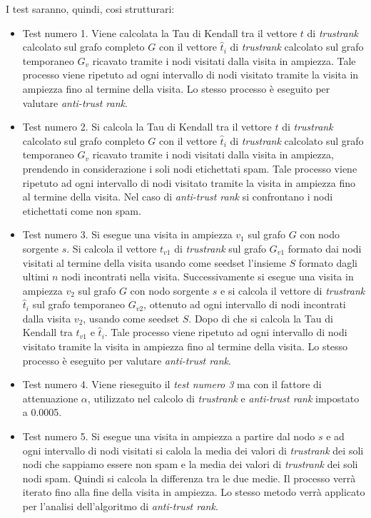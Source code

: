 I test saranno, quindi, cosi strutturari:
\begin{itemize}
 \item Test numero 1. Viene calcolata la Tau di Kendall tra il  vettore \(t\) di \textit{trustrank} calcolato sul grafo completo \(G\) con il vettore \(\hat{t}_i\) di \textit{trustrank} calcolato sul grafo temporaneo \(G_v\) ricavato tramite i nodi visitati dalla visita in ampiezza. Tale processo viene ripetuto ad ogni intervallo di nodi visitato tramite la visita in ampiezza fino al termine della visita. Lo stesso processo è eseguito per valutare \textit{anti-trust rank}.
 
 \item Test numero 2. Si calcola la Tau di Kendall tra il vettore \(t\)  di \textit{trustrank} calcolato sul grafo completo \(G\) con il vettore \(\hat{t}_i\) di \textit{trustrank} calcolato sul grafo temporaneo \(G_v\) ricavato tramite i nodi visitati dalla visita in ampiezza, prendendo in considerazione i soli nodi etichettati spam.  Tale processo viene ripetuto ad ogni intervallo di nodi visitato tramite la visita in ampiezza fino al termine della visita. Nel caso di \textit{anti-trust rank} si  confrontano i nodi etichettati come non spam.
 
 \item Test numero 3. Si esegue una visita in ampiezza \(v_1\) sul grafo \(G\) con nodo sorgente \(s\). Si calcola il vettore \(t_{v1}\) di \textit{trustrank} sul grafo \(G_{v1}\) formato dai nodi visitati al termine della visita usando come seedset l'insieme \(S\) formato dagli ultimi \(n\) nodi incontrati nella visita. Successivamente si esegue una visita in ampiezza \(v_2\) sul grafo \(G\) con nodo sorgente \(s\) e si calcola il vettore di \textit{trustrank} \(\hat{t}_i\) sul grafo temporaneo \(G_{v2}\), ottenuto ad ogni intervallo di nodi incontrati dalla visita \(v_2\), usando come seedset \(S\). Dopo di che si calcola la Tau di Kendall tra \(t_{v1}\) e \(\hat{t}_i\). Tale processo viene ripetuto ad ogni intervallo di nodi visitato tramite la visita in ampiezza fino al termine della visita. Lo stesso processo è eseguito per valutare \textit{anti-trust rank}.
 
 \item Test numero 4. Viene rieseguito il \textit{test numero 3} ma con il fattore di attenuazione \(\alpha\), utilizzato nel calcolo di \textit{trustrank} e \textit{anti-trust rank} impostato a 0.0005.
 
 \item Test numero 5. Si esegue una visita in ampiezza a partire dal nodo \(s\) e ad ogni intervallo di nodi visitati si calola la media dei valori di \textit{trustrank} dei soli nodi che sappiamo essere non spam e la media dei valori di \textit{trustrank} dei soli nodi spam. Quindi si calcola la differenza tra le due medie. Il processo verrà iterato fino alla fine della visita in ampiezza. Lo stesso metodo verrà applicato per l'analisi dell'algoritmo di \textit{anti-trust rank}.
 

\end{itemize}
